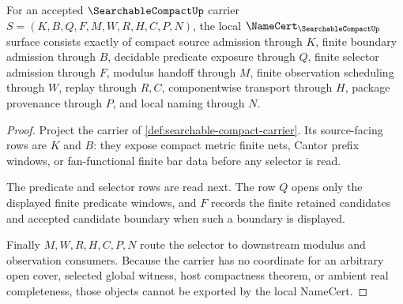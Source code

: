 \begin{theorem}
\label{thm:searchable-compact-namecert-obligations}
For an accepted $\SearchableCompactUp$ carrier $S=(K,B,Q,F,M,W,R,H,C,P,N)$, the local $\NameCert_{\SearchableCompactUp}$ surface consists exactly of compact source admission through $K$, finite boundary admission through $B$, decidable predicate exposure through $Q$, finite selector admission through $F$, modulus handoff through $M$, finite observation scheduling through $W$, replay through $R,C$, componentwise transport through $H$, package provenance through $P$, and local naming through $N$.
\end{theorem}
\begin{proof}
Project the carrier of \autoref{def:searchable-compact-carrier}. Its source-facing rows are $K$ and $B$: they expose compact metric finite nets, Cantor prefix windows, or fan-functional finite bar data before any selector is read.

The predicate and selector rows are read next. The row $Q$ opens only the displayed finite predicate windows, and $F$ records the finite retained candidates and accepted candidate boundary when such a boundary is displayed.

Finally $M,W,R,H,C,P,N$ route the selector to downstream modulus and observation consumers. Because the carrier has no coordinate for an arbitrary open cover, selected global witness, host compactness theorem, or ambient real completeness, those objects cannot be exported by the local NameCert.
\end{proof}

